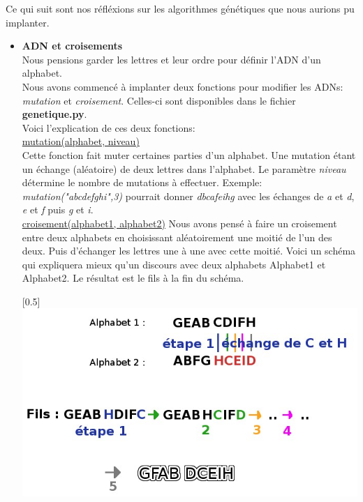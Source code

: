 \documentclass[a4paper, 11pt]{article}
\begin{document}
Ce qui suit sont nos réfléxions sur les algorithmes génétiques que nous aurions
pu implanter.\\
\begin{itemize}
\item \textbf{ADN et croisements}\\
Nous pensions garder les lettres et leur ordre pour définir l'ADN d'un alphabet.\\

Nous avons commencé à implanter deux fonctions pour modifier les ADNs: \textit{mutation} et \textit{croisement}.
Celles-ci sont disponibles dans le fichier \textbf{genetique.py}.\\

Voici l'explication de ces deux fonctions:\\

\underline{mutation(alphabet, niveau)}\\
Cette fonction fait muter certaines parties d'un alphabet. Une
mutation étant un échange (aléatoire) de deux lettres dans l'alphabet. Le paramètre
\textit{niveau} détermine le nombre de mutations à effectuer.
Exemple: \textit{mutation("abcdefghi",3)} pourrait donner
\textit{dbcafeihg} avec les échanges de \textit{a} et \textit{d},
\textit{e} et \textit{f} puis \textit{g} et \textit{i}.\\

\underline{croisement(alphabet1, alphabet2)}
Nous avons pensé à faire un croisement entre deux alphabets en
choisissant aléatoirement une moitié de l'un des deux. Puis d'échanger
les lettres une à une avec cette moitié. Voici un schéma qui
expliquera mieux qu'un discours avec deux alphabets Alphabet1 et
Alphabet2. Le résultat est le fils à la fin du schéma.
 
\begin{center}
 \scalebox{0.5}[0.5]{\includegraphics{./croisement.jpg}}
\end{center}



\end{itemize}
\end{document}
